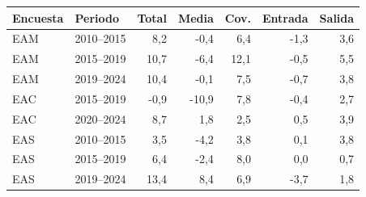 \begin{tabular}{llrrrrr}
\toprule
Encuesta & Periodo & Total & Media & Cov. & Entrada & Salida \\
\midrule
EAM & 2010--2015 & 8,2 & -0,4 & 6,4 & -1,3 & 3,6 \\
EAM & 2015--2019 & 10,7 & -6,4 & 12,1 & -0,5 & 5,5 \\
EAM & 2019--2024 & 10,4 & -0,1 & 7,5 & -0,7 & 3,8 \\
EAC & 2015--2019 & -0,9 & -10,9 & 7,8 & -0,4 & 2,7 \\
EAC & 2020--2024 & 8,7 & 1,8 & 2,5 & 0,5 & 3,9 \\
EAS & 2010--2015 & 3,5 & -4,2 & 3,8 & 0,1 & 3,8 \\
EAS & 2015--2019 & 6,4 & -2,4 & 8,0 & 0,0 & 0,7 \\
EAS & 2019--2024 & 13,4 & 8,4 & 6,9 & -3,7 & 1,8 \\
\bottomrule
\end{tabular}
